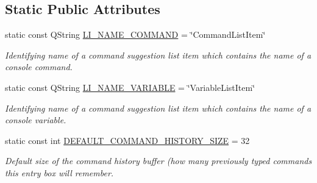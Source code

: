 \subsection*{Static Public Attributes}
\begin{DoxyCompactItemize}
\item 
\hypertarget{class_command_entry_box_afccb0e6456f6aa1264e5db11fdf1ca4e}{static const Q\-String \hyperlink{class_command_entry_box_afccb0e6456f6aa1264e5db11fdf1ca4e}{L\-I\-\_\-\-N\-A\-M\-E\-\_\-\-C\-O\-M\-M\-A\-N\-D} = \char`\"{}Command\-List\-Item\char`\"{}}\label{class_command_entry_box_afccb0e6456f6aa1264e5db11fdf1ca4e}

\begin{DoxyCompactList}\small\item\em Identifying name of a command suggestion list item which contains the name of a console command. \end{DoxyCompactList}\item 
\hypertarget{class_command_entry_box_a5301bf4e9f267a5d773ddcc087ae6d83}{static const Q\-String \hyperlink{class_command_entry_box_a5301bf4e9f267a5d773ddcc087ae6d83}{L\-I\-\_\-\-N\-A\-M\-E\-\_\-\-V\-A\-R\-I\-A\-B\-L\-E} = \char`\"{}Variable\-List\-Item\char`\"{}}\label{class_command_entry_box_a5301bf4e9f267a5d773ddcc087ae6d83}

\begin{DoxyCompactList}\small\item\em Identifying name of a command suggestion list item which contains the name of a console variable. \end{DoxyCompactList}\item 
\hypertarget{class_command_entry_box_a52a1a304da91b347e879e095cf5eab67}{static const int \hyperlink{class_command_entry_box_a52a1a304da91b347e879e095cf5eab67}{D\-E\-F\-A\-U\-L\-T\-\_\-\-C\-O\-M\-M\-A\-N\-D\-\_\-\-H\-I\-S\-T\-O\-R\-Y\-\_\-\-S\-I\-Z\-E} = 32}\label{class_command_entry_box_a52a1a304da91b347e879e095cf5eab67}

\begin{DoxyCompactList}\small\item\em Default size of the command history buffer (how many previously typed commands this entry box will remember. \end{DoxyCompactList}\end{DoxyCompactItemize}
